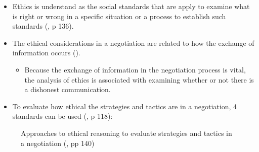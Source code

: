 \documentclass[
  ignorenonframetext,
]{beamer}
\providecommand{\tightlist}{%
  \setlength{\itemsep}{0pt}\setlength{\parskip}{0pt}}\usepackage{longtable,booktabs,array}
\begin{document}
\begin{frame}{}
\label{section-2}
\begin{itemize}
\item
  Ethics is understand as the social standards that are apply to examine
  what is right or wrong in a specific situation or a process to
  establish such standards
  (, p 136).
\item
  The ethical considerations in a negotiation are related to how the
  exchange of information occurs
  ().

  \begin{itemize}
  \tightlist
  \item
    Because the exchange of information in the negotiation process is
    vital, the analysis of ethics is associated with examining whether
    or not there is a dishonest communication.
  \end{itemize}
\end{itemize}
\end{frame}

\begin{frame}{}
\label{section-3}
\begin{itemize}
\tightlist
\item
  To evaluate how ethical the strategies and tactics are in a
  negotiation, 4 standards can be used
  (, p 118):
\end{itemize}

\begin{figure}


\caption{\label{fig-approaches-to-ethical-reasoning}Approaches to
ethical reasoning to evaluate strategies and tactics in a negotiation
(, pp 140)}

\end{figure}%
\end{frame}
\end{document}
